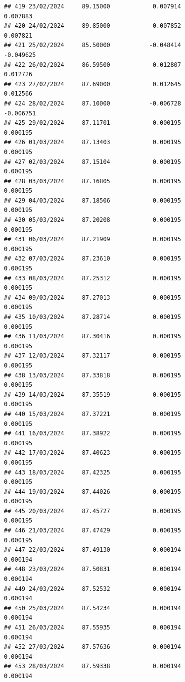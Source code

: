 \documentclass[
]{article}
\begin{document}
\begin{verbatim}
## 419 23/02/2024     89.15000            0.007914                0.007883
## 420 24/02/2024     89.85000            0.007852                0.007821
## 421 25/02/2024     85.50000           -0.048414               -0.049625
## 422 26/02/2024     86.59500            0.012807                0.012726
## 423 27/02/2024     87.69000            0.012645                0.012566
## 424 28/02/2024     87.10000           -0.006728               -0.006751
## 425 29/02/2024     87.11701            0.000195                0.000195
## 426 01/03/2024     87.13403            0.000195                0.000195
## 427 02/03/2024     87.15104            0.000195                0.000195
## 428 03/03/2024     87.16805            0.000195                0.000195
## 429 04/03/2024     87.18506            0.000195                0.000195
## 430 05/03/2024     87.20208            0.000195                0.000195
## 431 06/03/2024     87.21909            0.000195                0.000195
## 432 07/03/2024     87.23610            0.000195                0.000195
## 433 08/03/2024     87.25312            0.000195                0.000195
## 434 09/03/2024     87.27013            0.000195                0.000195
## 435 10/03/2024     87.28714            0.000195                0.000195
## 436 11/03/2024     87.30416            0.000195                0.000195
## 437 12/03/2024     87.32117            0.000195                0.000195
## 438 13/03/2024     87.33818            0.000195                0.000195
## 439 14/03/2024     87.35519            0.000195                0.000195
## 440 15/03/2024     87.37221            0.000195                0.000195
## 441 16/03/2024     87.38922            0.000195                0.000195
## 442 17/03/2024     87.40623            0.000195                0.000195
## 443 18/03/2024     87.42325            0.000195                0.000195
## 444 19/03/2024     87.44026            0.000195                0.000195
## 445 20/03/2024     87.45727            0.000195                0.000195
## 446 21/03/2024     87.47429            0.000195                0.000195
## 447 22/03/2024     87.49130            0.000194                0.000194
## 448 23/03/2024     87.50831            0.000194                0.000194
## 449 24/03/2024     87.52532            0.000194                0.000194
## 450 25/03/2024     87.54234            0.000194                0.000194
## 451 26/03/2024     87.55935            0.000194                0.000194
## 452 27/03/2024     87.57636            0.000194                0.000194
## 453 28/03/2024     87.59338            0.000194                0.000194

\end{verbatim}
\end{document}
